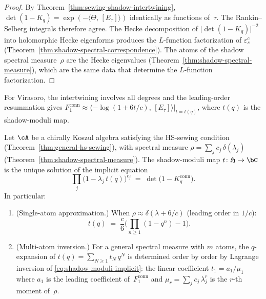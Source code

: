 \begin{proof}
By Theorem~\ref{thm:sewing-shadow-intertwining},
$\det(1 - K_q) = \exp(-\langle\Theta,\,[E_\tau]\rangle)$
identically as functions of~$\tau$. The Rankin--Selberg
integrals therefore agree. The Hecke decomposition of
$\lvert\det(1-K_q)\rvert^{-2}$ into holomorphic Hecke
eigenforms produces the $L$-function factorization of
$\varepsilon^c_s$ (Theorem~\ref{thm:shadow-spectral-correspondence}).
The atoms of the shadow spectral measure~$\rho$ are the Hecke
eigenvalues (Theorem~\ref{thm:shadow-spectral-measure}),
which are the same data that determine the $L$-function
factorization.
\end{proof}

For Virasoro, the intertwining involves all degrees and the
leading-order resummation gives
$F_1^{\mathrm{conn}} \approx
\langle -\!\log(1 + 6t/c),\,[E_\tau]\rangle|_{t = t(q)}$,
where $t(q)$ is the shadow-moduli map.

\begin{theorem}
\label{thm:shadow-moduli-resolution}
\ClaimStatusConditional
{}%
Let $\cA$ be a chirally Koszul algebra satisfying the HS-sewing
condition
\textup{(}Theorem~\textup{\ref{thm:general-hs-sewing}}\textup{)},
with spectral measure
$\rho = \sum_j c_j\,\delta(\lambda_j)$
\textup{(}Theorem~\textup{\ref{thm:shadow-spectral-measure}}\textup{)}.
The shadow-moduli map $t \colon \mathfrak{H} \to \bC$ is the unique solution
of the implicit equation
\begin{equation}\label{eq:shadow-moduli-implicit}
 \prod_j \bigl(1 - \lambda_j\,t(q)\bigr)^{c_j}
 \;=\;
 \det\!\bigl(1 - K_q^{\mathrm{conn}}\bigr).
\end{equation}
In particular:
\begin{enumerate}[label=\textup{(\roman*)}]
\item
\textup{(}Single-atom approximation.\textup{)}\;
When $\rho \approx \delta(\lambda + 6/c)$
\textup{(}leading order in $1/c$\textup{)}:
\begin{equation}\label{eq:shadow-moduli-leading}
 t(q)
 \;=\;
 \frac{c}{6}\biggl(
 \prod_{n\ge1}(1-q^n) - 1
 \biggr).
\end{equation}
\item
\textup{(}Multi-atom inversion.\textup{)}\;
For a general spectral measure with $m$ atoms, the
$q$-expansion of $t(q) = \sum_{N\ge1} t_N\,q^N$ is
determined order by order by Lagrange inversion of
\eqref{eq:shadow-moduli-implicit}: the linear coefficient
$t_1 = a_1/\mu_1$ where $a_1$ is the leading coefficient
of~$F_1^{\mathrm{conn}}$ and
$\mu_r = \sum_j c_j\,\lambda_j^r$
is the $r$-th moment of~$\rho$.
\end{enumerate}
\end{theorem}


